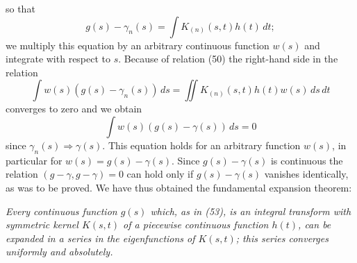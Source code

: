 so that
\[
g(s)-\gamma_n(s)=\int K_{(n)}(s,t)h(t)\,dt;
\]
we multiply this equation by an arbitrary continuous function $w(s)$ and integrate with respect to $s$. Because of relation (50) the right-hand side in the relation
\[
\int w(s)(g(s)-\gamma_n(s))\,ds
=\iint K_{(n)}(s,t)h(t)w(s)\,ds\,dt
\]
converges to zero and we obtain
\[
\int w(s)(g(s)-\gamma(s))\,ds=0
\]
since $\gamma_n(s)\Rightarrow\gamma(s)$. This equation holds for an arbitrary function $w(s)$, in particular for $w(s)=g(s)-\gamma(s)$. Since $g(s)-\gamma(s)$ is continuous the relation $(g-\gamma,g-\gamma)=0$ can hold only if $g(s)-\gamma(s)$ vanishes identically, as was to be proved. We have thus obtained the fundamental expansion theorem:

\emph{Every continuous function $g(s)$ which, as in (53), is an integral transform with symmetric kernel $K(s,t)$ of a piecewise continuous function $h(t)$, can be expanded in a series in the eigenfunctions of $K(s,t)$; this series converges uniformly and absolutely.}

